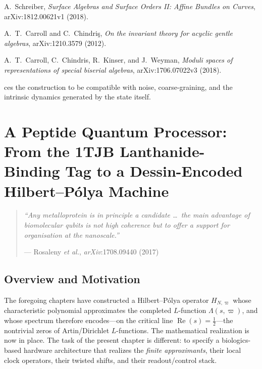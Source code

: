 \documentclass[11pt,oneside]{amsbook}
\numberwithin{equation}{section}
\theoremstyle{plain}
\theoremstyle{definition}
\theoremstyle{remark}
\begin{document}
A.~Schreiber,
\newblock \emph{Surface Algebras and Surface Orders II: Affine Bundles on Curves},
\newblock arXiv:1812.00621v1 (2018).


A.~T.~Carroll and C.~Chindri\c{s},
\newblock \emph{On the invariant theory for acyclic gentle algebras},
\newblock arXiv:1210.3579 (2012).

A.~T.~Carroll, C.~Chindris, R.~Kinser, and J.~Weyman,
\newblock \emph{Moduli spaces of representations of special biserial algebras},
\newblock arXiv:1706.07022v3 (2018).


ces the construction to be compatible with noise, coarse-graining, and the intrinsic dynamics generated by the state itself.


\fi



\chapter{A Peptide Quantum Processor: From the 1TJB Lanthanide-Binding Tag
         to a Dessin-Encoded Hilbert--P\'olya Machine}
\label{ch:peptide_qpu}

\begin{quote}
\itshape ``Any metalloprotein is in principle a candidate \dots\ the main
advantage of biomolecular qubits is not high coherence but to offer a support
for organisation at the nanoscale.''
\upshape\par\medskip\noindent\hfill
--- Rosaleny \emph{et al.}, \emph{arXiv}:1708.09440 (2017)
\end{quote}

\section{Overview and Motivation}
\label{sec:pqpu_overview}

The foregoing chapters have constructed a Hilbert--P\'olya operator
$H_{N,\varpi}$ whose characteristic polynomial approximates the completed
$L$-function $\Lambda(s,\varpi)$, and whose spectrum therefore encodes---on the
critical line $\operatorname{Re}(s)=\tfrac{1}{2}$---the nontrivial zeros of
Artin/Dirichlet $L$-functions.  The mathematical realization is now in place.
The task of the present chapter is different: to specify a biologics-based
hardware architecture that realizes the \emph{finite approximants}, their local
clock operators, their twisted shifts, and their readout/control stack.
\end{document}
